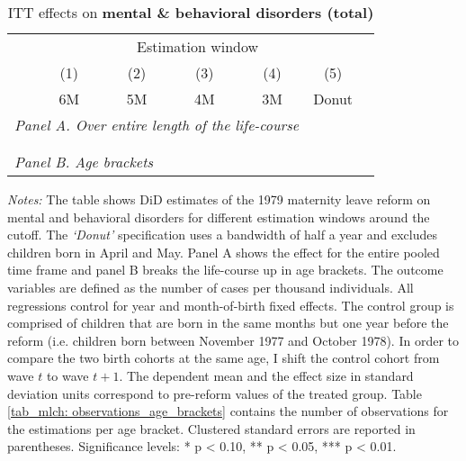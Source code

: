 \vspace*{\fill}
\begin{table}[H] \centering 
 \begin{threeparttable} \centering \caption{ITT effects on \textbf{mental \& behavioral disorders (total)}}\label{tab_mlch: DD_d5_total}
  {\def\sym#1{\ifmmode^{#1}\else\(^{#1}\)\fi} 
 	\begin{tabular}{l*{6}{c}}
 		\toprule 
 		& \multicolumn{5}{c}{Estimation window} \\ 
 		\cmidrule(lr){2-6}
 		&\multicolumn{1}{c}{(1)}&\multicolumn{1}{c}{(2)}&\multicolumn{1}{c}{(3)}&\multicolumn{1}{c}{(4)}&\multicolumn{1}{c}{(5)}\\
 		&\multicolumn{1}{c}{6M}&\multicolumn{1}{c}{5M}&\multicolumn{1}{c}{4M}&\multicolumn{1}{c}{3M}&\multicolumn{1}{c}{Donut}\\
 		\midrule
 		\multicolumn{5}{l}{\emph{Panel A. Over entire length of the life-course}} \\
 		 \\ \\
 		\multicolumn{5}{l}{\emph{Panel B. Age brackets}} \\
 		    
 		\bottomrule 
 	\end{tabular}}
 	\begin{tablenotes} 
 		\item \scriptsize \emph{Notes:} The table shows DiD estimates of the 1979 maternity leave reform on mental and behavioral disorders for different estimation windows around the cutoff. The \textit{`Donut'} specification uses a bandwidth of half a year and excludes children born in April and May. Panel A shows the effect for the entire pooled time frame and panel B breaks the life-course up in age brackets. The outcome variables are defined as the number of cases per thousand individuals. All regressions control for year and month-of-birth fixed effects. The control group is comprised of children that are born in the same months but one year before the reform (i.e. children born between November 1977 and October 1978). In order to compare the two birth cohorts at the same age, I shift the control cohort from wave $t$ to wave $t+1$. The dependent mean and the effect size in standard deviation units correspond to pre-reform values of the treated group. Table \ref{tab_mlch: observations_age_brackets} contains the number of observations for the estimations per age bracket. Clustered standard errors are reported in parentheses. \newline Significance levels: * p < 0.10, ** p < 0.05, *** p < 0.01. \newline 	%
 	\end{tablenotes} 
 \end{threeparttable} 
 \end{table}
\vspace*{\fill}\clearpage 